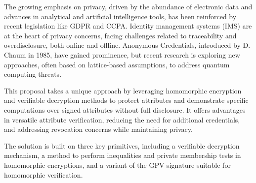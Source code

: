 The growing emphasis on privacy, driven by the abundance of electronic data and advances in analytical and artificial intelligence tools, has been reinforced by recent legislation like GDPR and CCPA. Identity management systems (IMS) are at the heart of privacy concerns, facing challenges related to traceability and overdisclosure, both online and offline. Anonymous Credentials, introduced by D. Chaum in 1985, have gained prominence, but recent research is exploring new approaches, often based on lattice-based assumptions, to address quantum computing threats.

This proposal takes a unique approach by leveraging homomorphic encryption and verifiable decryption methods to protect attributes and demonstrate specific computations over signed attributes without full disclosure. It offers advantages in versatile attribute verification, reducing the need for additional credentials, and addressing revocation concerns while maintaining privacy.

The solution is built on three key primitives, including a verifiable decryption mechanism, a method to perform inequalities and private membership tests in homomorphic encryptions, and a variant of the GPV signature suitable for homomorphic verification.